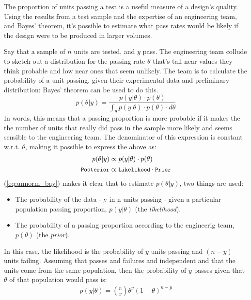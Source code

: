 \documentclass[11pt,a4paper,article]{memoir} %
\begin{document}
\par
The proportion of units passing a test is a useful measure of a design's quality. Using the results from a test sample and the expertise of an engineering team, and Bayes' theorem, it's possible to estimate what pass rates would be likely if the design were to be produced in larger volumes.
\par
Say that a sample of $n$ units are tested, and $y$ pass. The engineering team collude to sketch out a distribution for the passing rate $\theta$ that's tall near values they think probable and low near ones that seem unlikely. The team is to calculate the probability of a unit passing, given their experimental data and preliminary distribution: Bayes' theorem can be used to do this.
\begin{equation}
  p(\theta|y) = \frac{p(y|\theta)\cdot p(\theta)}{\int_{\theta}p(y|\theta)\cdot p(\theta)\cdot d\theta}
  \label{eq:bayes}
\end{equation}
In words, this means that a passing proportion is more probable if it makes the the number of units that really did pass in the sample more likely and seems sensible to the engineering team. The denominator of this expression is constant w.r.t. $\theta$, making it possible to express the above as:
\begin{align}
  p(\theta|y) &\propto p(y | \theta)\cdot p(\theta)   \label{eq:unnorm_bay} \\
  \small{\texttt{Posterior}} &\propto\small{{\texttt{Likelihood} \cdot \texttt{Prior}}} \nonumber
\end{align}
(\ref{eq:unnorm_bay}) makes it clear that to estimate $p(\theta|y)$, two things are used:
\begin{itemize}
\item The probability of the data - y in n units passing - given a particular population passing proportion, $p(y|\theta)$ (the \emph{likelihood}).
\item  The probability of a passing proportion according to the engineerig team, $p(\theta)$ (the \emph{prior}).
\end{itemize}
In this case, the likelihood is the probability of $y$ units passing and $(n-y)$ units failing. Assuming that passes and failures and independent and that the units come from the same population, then the probability of $y$ passes given that $\theta$ of that population would pass is:
\begin{gather}
  p(y|\theta) = \binom{n}{y} \theta^y (1 - \theta)^{n - y}
  \label{eq:binom_likelihood}
\end{gather}
\end{document}

